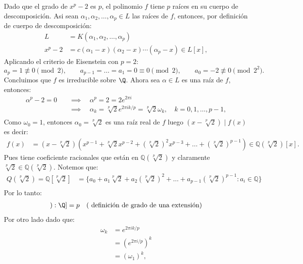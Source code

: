 \begin{solucion}
Dado que el grado de $x^p-2$ es $p$, el polinomio $f$ tiene $p$ raíces en su cuerpo de descomposición. Asi sean $\alpha_1, \alpha_2, \ldots, \alpha_p \in L$ las raíces de $f$, entonces, por definición de cuerpo de descomposición:
\begin{align*}
L &= K(\alpha_1, \alpha_2, \ldots, \alpha_p) \\
x^p - 2 &= c(\alpha_1 - x)(\alpha_2 - x) \cdots (\alpha_p - x) \in L[x],
\end{align*}
Aplicando el criterio de Eisenstein con $p=2$:
\[
a_{p}=1\not\equiv0\pmod2,\qquad
a_{p-1}=\dots=a_{1}=0\equiv0\pmod2,\qquad
a_{0}=-2\not\equiv0\pmod{2^{2}}.
\]
Concluimos que $f$ es irreducible sobre $\Q$. Ahora sea $\alpha \in L$ es una raíz de $f$, entonces:
\begin{align*}
\alpha^p - 2 =0 \quad &\implies \quad \alpha^p = 2 = 2 e^{2\pi i}\\
&\implies \quad \alpha_k = \sqrt[p]{2} e^{2\pi i k/p} = \sqrt[p]{2} \omega_k, \quad k=0,1,\ldots,p-1,\\
\end{align*}
Como $\omega_0 = 1$, entonces $\alpha_0 = \sqrt[p]{2}$ es una raíz real de $f$ luego $\left(x-\sqrt[p]{2}\right)\mid f(x)$ es decir:
\begin{align*}
f(x) &= \left(x-\sqrt[p]{2}\right)\left(x^{p-1} + \sqrt[p]{2} x^{p-2} + \left(\sqrt[p]{2}\right)^2 x^{p-3} + \ldots + \left(\sqrt[p]{2}\right)^{p-1}\right)\in \mathbb Q(\sqrt[p]{2})[x].
\end{align*}
Pues tiene coeficiente racionales que están en $\mathbb Q(\sqrt[p]{2})$ y claramente $\sqrt[p]{2} \in \mathbb Q(\sqrt[p]{2})$. Notemos que:
\begin{align*}
  Q(\sqrt[p]{2})= \mathbb Q[\sqrt[p]{2}] &= \{a_0 + a_1 \sqrt[p]{2} + a_2 \left(\sqrt[p]{2}\right)^2 + \ldots + a_{p-1} \left(\sqrt[p]{2}\right)^{p-1} : a_i \in \mathbb Q\}\\
\end{align*}
Por lo tanto:
\begin{align*}
  [\mathbb Q(\sqrt[p]{2}):\Q] &= p \quad \text{( definición de grado de una extensión)}\\
\end{align*}
Por otro lado dado que:
\begin{align*}
  \omega_k &= e^{2\pi i k/p} \\
  &= \left(e^{2\pi i/p}\right)^k \\
  &= (\omega_1)^k,
\end{align*}

\end{solucion}
